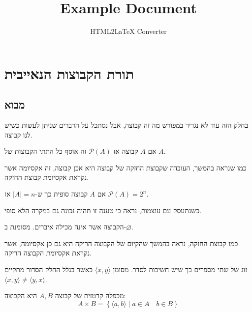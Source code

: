 \documentclass{tstextbook}
\begin{document}
\title{Example Document}
\author{HTML2LaTeX Converter}
\maketitle

\chapter{תורת הקבוצות הנאייבית}

\section{מבוא}

בחלק הזה עוד לא נגדיר במפורש מה זה קבוצה, אבל נסתכל על הדברים שניתן לעשות כשיש לנו קבוצה. 

\begin{definition}
אם \(A\) קבוצה אז \(\mathcal{P}(A)\) זה אוסף כל התתי הקבוצות של \(A\).

\end{definition}
\begin{remark}
כמו שנראה בהמשך, העובדה שקבוצת החזקה של קבוצה היא אכן קבוצה, זה אקסיומה אשר נקראת אקסיומת קבוצת החזקה.

\end{remark}
\begin{proposition}
אם \(A\) קבוצה סופית כך ש-\(|A|=n\) אז \(\mathcal{P}(A)=2^{n}\).

\end{proposition}
\begin{remark}
כשנתעסק עם עוצמות, נראה כי טענה זו תהיה נכונה גם במקרה הלא סופי.

\end{remark}
\begin{definition}
הקבוצה אשר אינה מכילה איברים. מסומנת ב-\(\varnothing\).

\end{definition}
\begin{remark}
כמו קבוצת החזקה, נראה בהמשך שהקיום של הקבוצה הריקה היא גם כן אקסיומה, אשר נקראת אקסיומת הקבוצה הריקה.

\end{remark}
\begin{definition}
זוג של שתי מספרים כך שיש חשיבות לסדר. מסומן \(\langle x,y \rangle\) כאשר בגלל החלק הסדור מתקיים \(\langle x, y \rangle\neq \langle y, x \rangle\).

\end{definition}
\begin{definition}
מכפלה קרטזית של קבוצה \(A,B\) היא הקבוצה:
$$A\times B = \left\{  \langle a, b \rangle \mid a\in A\quad b \in B  \right\}$$

\end{definition}
\end{document}
